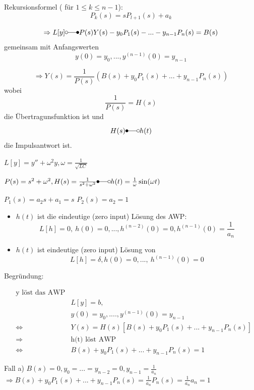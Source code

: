 \documentclass[10pt,a4paper]{article}
\begin{document}
Rekursionsformel ( für $1 \leq k \leq n-1$):
$$P_k(s) = sP_{l+1}(s)+a_k$$

$$\Rightarrow L[y] \laplace P(s)Y(s)-y_0 P_1(s)-...-y_{n-1}P_n(s)=B(s)$$
gemeinsam mit Anfangswerten $$y(0)=y_0, ..., y^{(n-1)}(0)=y_{n-1}$$

$$\Rightarrow Y(s)=\frac{1}{P(s)} (B(s)+y_0P_1(s)+...+y_{n-1}P_n(s))$$ wobei $$\frac{1}{P(s)} = H(s)$$ die Übertragunsfunktion ist und $$H(s)\Laplace h(t)$$ die Impulsantwort ist.


\begin{bsp}

$L[y]=y''+\omega^{2}y, \omega=\frac{1}{\sqrt{LC}}$

$P(s)=s^{2}+\omega^{2}, H(s)=\frac{1}{s^{2}+\omega^{2}} \Laplace h(t)=\frac{1}{\omega}\sin(\omega t)$

$P_1(s)=a_2 s+ a_1=s$
$P_2(s)=a_2=1$

\end{bsp}

\begin{defi}

\begin{itemize}
\item $h(t)$ ist die eindeutige  (zero input) Lösung des AWP:
$$L[h]=0, ~ h(0)=0,...,h^{(n-2)}(0)=0, h^{(n-1)}(0)=\frac{1}{a_n}$$

\item $h(t)$ ist eindeutige  (zero input) Lösung von
$$L[h]=\delta, h(0)=0,..., ~ h^{(n-1)}(0)=0$$
\end{itemize}


\end{defi}

Begründung:

\begin{eqnarray*}
& \text{y löst das AWP} & \\
&& L[y]=b, \\
&& y(0)=y_0, ...., y^{(n-1)}(0)=y_{n-1} \\
&\Leftrightarrow & Y(s)=H(s)[B(s)+y_0 P_1(s)+...+ y_{n-1}P_n(s)] \\
& \Rightarrow & \text{h(t) löst AWP} \\
& \Leftrightarrow & B(s)+y_0 P_1(s)+...+ y_{n-1}P_n(s) = 1
\end{eqnarray*}


Fall a) $B(s)=0, y_0=...=y_{n-2}=0, y_{n-1}=\frac{1}{a_n}$
$\Rightarrow B(s)+y_0 P_1(s)+...+ y_{n-1}P_n(s)= \frac{1}{a_n} P_n(s) = \frac{1}{a_n} a_n = 1$
\end{document}

